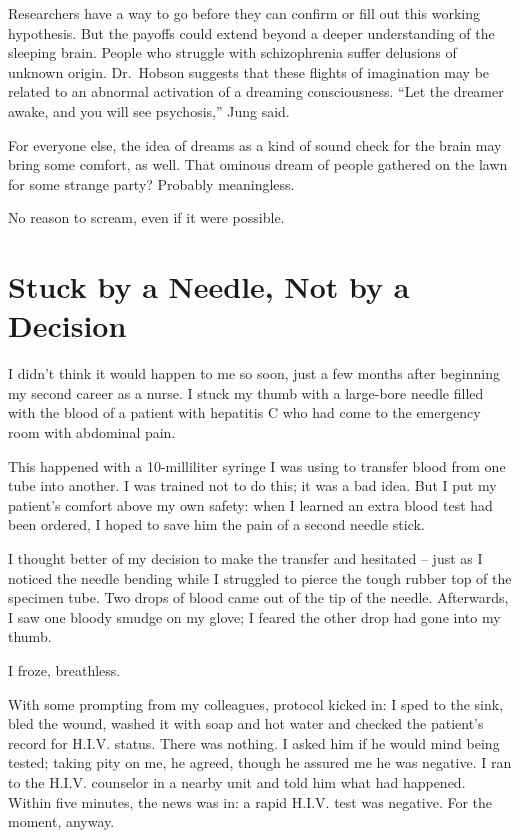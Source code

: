 ﻿\documentclass[12pt]{article}
\begin{document}
Researchers have a way to go before they can confirm or fill out this working hypothesis. But the
payoffs could extend beyond a deeper understanding of the sleeping brain. People who struggle with
schizophrenia suffer delusions of unknown origin. Dr.~Hobson suggests that these flights of
imagination may be related to an abnormal activation of a dreaming consciousness. ``Let the dreamer
awake, and you will see psychosis,'' Jung said.

For everyone else, the idea of dreams as a kind of sound check for the brain may bring some comfort,
as well. That ominous dream of people gathered on the lawn for some strange party? Probably
meaningless.

No reason to scream, even if it were possible.

\section{Stuck by a Needle, Not by a Decision}

\lettrine{I}{} didn't think it would happen to me so soon, just a few months
after beginning my second career as a nurse. I stuck my thumb with a large-bore needle filled with
the blood of a patient with hepatitis C who had come to the emergency room with abdominal pain.

This happened with a 10-milliliter syringe I was using to transfer blood from one tube into another.
I was trained not to do this; it was a bad idea. But I put my patient's comfort above my own safety:
when I learned an extra blood test had been ordered, I hoped to save him the pain of a second needle
stick.

I thought better of my decision to make the transfer and hesitated -- just as I noticed the needle
bending while I struggled to pierce the tough rubber top of the specimen tube. Two drops of blood
came out of the tip of the needle. Afterwards, I saw one bloody smudge on my glove; I feared the
other drop had gone into my thumb.

I froze, breathless.

With some prompting from my colleagues, protocol kicked in: I sped to the sink, bled the wound,
washed it with soap and hot water and checked the patient's record for H.I.V. status. There was
nothing. I asked him if he would mind being tested; taking pity on me, he agreed, though he assured
me he was negative. I ran to the H.I.V. counselor in a nearby unit and told him what had happened.
Within five minutes, the news was in: a rapid H.I.V. test was negative. For the moment, anyway.
\end{document}
